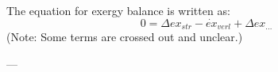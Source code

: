 The equation for exergy balance is written as:  
\[
0 = \Delta ex_{str} - \dot{ex}_{verl} + \Delta ex_{...}
\]  
(Note: Some terms are crossed out and unclear.)

---